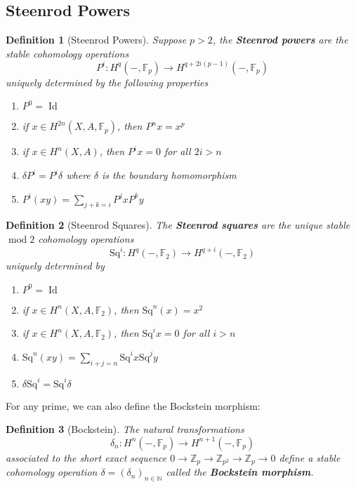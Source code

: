 \documentclass[11pt, a4paper]{article}
\DeclareMathOperator*{\id}{Id}
\DeclareMathOperator*{\cmod}{mod}
\newcommand{\sq}{\mathrm{Sq}}
\newtheorem{defn}{Definition}
\theoremstyle{plain}
\begin{document}
\subsection{Steenrod Powers}
\begin{defn}[Steenrod Powers]
	Suppose $p>2$,
	the \textbf{Steenrod powers} are the stable cohomology operations 
	\[ 
		P^{i}\colon H^{q}( -, \mathbb{F}_p) \to H^{q+ 2i ( p-1) }( -, \mathbb{F}_p) 
	\]
	uniquely determined by the following properties
	\begin{enumerate}
	\item $P^{0}= \id$ 
	\item if $x \in H^{2n}( X,A, \mathbb{F}_p) $, then $P^{n}x = x^{p}$ 
	\item if $x \in H^{n}( X,A) $, then $P^{i}x =0$ for all $2i >n$ 
	\item $\delta P^{i} = P^{i}\delta$ where $\delta$ is the boundary homomorphism
	\item $P^{i}( xy) = \sum_{j+k=i} P^{j}x P^{k}y$
	\end{enumerate}
\end{defn}
\begin{defn}[Steenrod Squares]
	The \textbf{Steenrod squares} are the unique stable $\cmod 2$ cohomology operations
	$$
\sq ^{i} \colon H^{q}( -, \mathbb{F}_2) \to H^{q+i}( -, \mathbb{F}_2) 
$$
	uniquely determined by
	\begin{enumerate}
	\item $P^{0}= \id$ 
	\item if $x\in H^{n}( X, A, \mathbb{F}_2) $, then $\sq^{n}( x) = x^{2}$ 
	\item if $x \in H^{n}( X,A, \mathbb{F}_2) $, then $\sq^{i}x =0$ for all $i> n$ 
	\item $\sq^{n}( xy) = \sum_{i+j=n}\sq^{i}x \sq^{j}y$ 
	\item $\delta \sq^{i}= \sq^{i}\delta$ 
	\end{enumerate}
\end{defn}
For any prime, we can also define the Bockstein morphism:
\begin{defn}[Bockstein]
	The natural transformations
	\[ 
	\delta_n\colon H^{n}( -, \mathbb{F}_p) \to H^{n+1}( -, \mathbb{F}_p) 
	\]
	associated to the short exact sequence $0 \to \mathbb{Z}_p \to \mathbb{Z}_{p^{2}} \to \mathbb{Z}_p \to 0$ define a stable cohomology operation $\delta = ( \delta_n)_{n \in \mathbb{N}} $ called the \textbf{Bockstein morphism}.
	
\end{defn}
\end{document}
